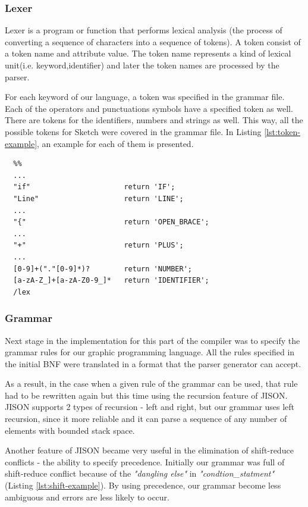 \documentclass{l3proj}
\begin{document}
\subsubsection{Lexer}
Lexer is a program or function that performs lexical analysis (the process of converting a sequence of characters into a sequence of tokens).
A token consist of a token name and attribute value. The token name represents a kind of lexical unit(i.e. keyword,identifier) and later the token names are processed by the parser. 

For each keyword of  our language, a token was specified in the grammar file. Each of the operators and punctuations symbols have a specified token as well. There are tokens for the identifiers, numbers and strings as well. This way, all the possible tokens for Sketch were covered in the grammar file. In Listing \ref{lst:token-example}, an example for each of them is presented. 
\begin{center}
\lstset{
    basicstyle=\small\ttfamily,
    frame=lrtb,
  }
  

  
  \begin{lstlisting}[caption={Tokens of Sketch },label={lst:token-example}]
  %lex
  %% 
  ...
  "if"                      return 'IF';
  "Line"                    return 'LINE';
  ...
  "{"                       return 'OPEN_BRACE';
  ...
  "+"                       return 'PLUS';
  ... 
  [0-9]+("."[0-9]*)?        return 'NUMBER';
  [a-zA-Z_]+[a-zA-Z0-9_]*   return 'IDENTIFIER';
  /lex
  \end{lstlisting}
\end{center}

\subsubsection{Grammar}
Next stage in the implementation for this part of the compiler was to specify the grammar rules for our graphic programming language. All the rules specified in the initial BNF were translated in a format that the parser generator can accept. 

As a result, in the case when a given rule of the grammar can be used, that rule had to be rewritten again  but this time using the recursion feature of JISON. JISON supports 2 types of recursion - left and right, but our grammar uses left recursion, since it more reliable and it can parse a sequence of any number of elements with bounded stack space.


Another feature of JISON became very useful in the elimination of shift-reduce conflicts - the ability to specify precedence. Initially our grammar was full of shift-reduce conflict because of the \textit{"dangling else"}  in \textit{"condtion\_statment"} (Listing \ref{lst:shift-example}). By using precedence, our grammar become less ambiguous and errors are less likely to occur. 
\end{document}
